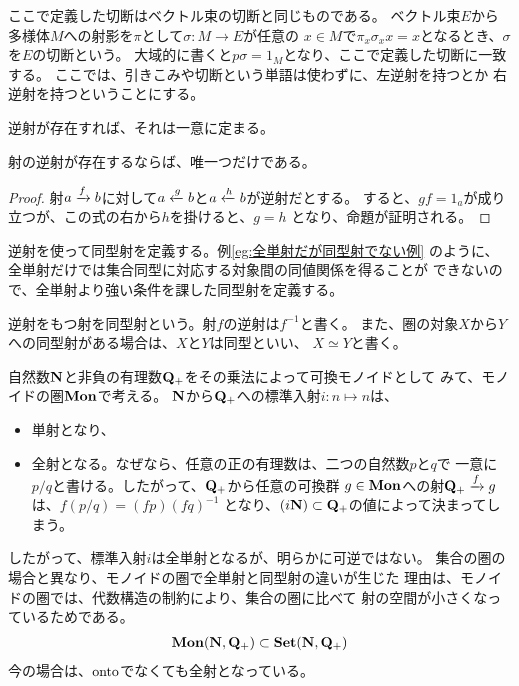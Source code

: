 	ここで定義した切断はベクトル束の切断と同じものである。
	ベクトル束$E$から多様体$M$への射影を$\pi$として$\sigma:M\to E$が任意の
	$x\in M$で$\pi_x\sigma_xx=x$となるとき、$\sigma$を$E$の切断という。
	大域的に書くと$p\sigma=1_M$となり、ここで定義した切断に一致する。
	ここでは、引きこみや切断という単語は使わずに、左逆射を持つとか
	右逆射を持つということにする。

	逆射が存在すれば、それは一意に定まる。

	\begin{proposition}[逆射の一意性]\label{prop:逆射の一意性} %
		射の逆射が存在するならば、唯一つだけである。
	\end{proposition} %
	\begin{proof} %
		射$a\xrightarrow[{}]{f}b$に対して$a\xleftarrow[{}]{g}b$と$a\xleftarrow[{}]{h}b$が逆射だとする。
		すると、$gf=1_a$が成り立つが、この式の右から$h$を掛けると、$g=h$
		となり、命題が証明される。
	\end{proof} %

	逆射を使って同型射を定義する。例\ref{eg:全単射だが同型射でない例}
	のように、全単射だけでは集合同型に対応する対象間の同値関係を得ることが
	できないので、全単射より強い条件を課した同型射を定義する。

	\begin{definition}[同型射]\label{def:同型射} %
		逆射をもつ射を同型射という。射$f$の逆射は$f^{-1}$と書く。
		また、圏の対象$X$から$Y$への同型射がある場合は、$X$と$Y$は同型といい、
		$X\simeq Y$と書く。
	\end{definition} %

	\begin{example}[全単射だが同型射でない例]\label{eg:全単射だが同型射でない例} %
		自然数$\mathbf{N}$と非負の有理数$\mathbf{Q}_+$をその乗法によって可換モノイドとして
		みて、モノイドの圏${\mathbf{Mon}}$で考える。
		$\mathbf{N}$から$\mathbf{Q}_+$への標準入射$i:n\mapsto n$は、
		\begin{itemize}\setlength{\itemsep}{-1mm} %
			\item 単射となり、
			\item 全射となる。なぜなら、任意の正の有理数は、二つの自然数$p$と$q$で
			一意に$p/q$と書ける。したがって、$\mathbf{Q}_+$から任意の可換群
			$g\in{\ensuremath{\mathbf{Mon}}}$への射$\mathbf{Q}_+\xrightarrow[{}]{f}g$は、$f(p/q)=(fp)(fq)^{-1}$
			となり、$(i\mathbf{N})\subset\mathbf{Q}_+$の値によって決まってしまう。
		\end{itemize} %
		したがって、標準入射$i$は全単射となるが、明らかに可逆ではない。
		集合の圏の場合と異なり、モノイドの圏で全単射と同型射の違いが生じた
		理由は、モノイドの圏では、代数構造の制約により、集合の圏に比べて
		射の空間が小さくなっているためである。
		\begin{equation*}\begin{split} %
			\mybf{Mon}(\sizen,\bun_+) \subset \mybf{Set}(\sizen,\bun_+)
		\end{split}\end{equation*} %
		今の場合は、$\operatorname{onto}$でなくても全射となっている。
	\end{example} %

